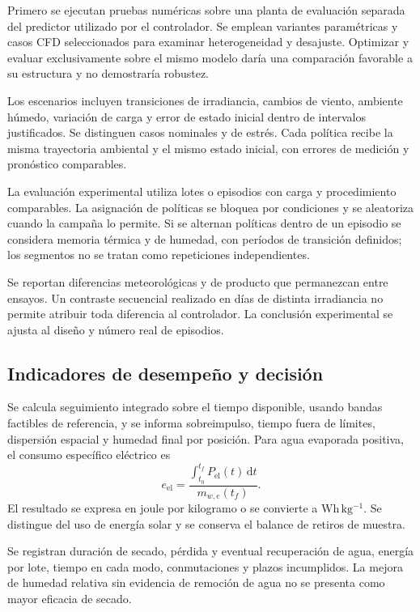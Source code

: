 Primero se ejecutan pruebas numéricas sobre una planta de evaluación separada del predictor utilizado por el controlador. Se emplean variantes paramétricas y casos CFD seleccionados para examinar heterogeneidad y desajuste. Optimizar y evaluar exclusivamente sobre el mismo modelo daría una comparación favorable a su estructura y no demostraría robustez.

Los escenarios incluyen transiciones de irradiancia, cambios de viento, ambiente húmedo, variación de carga y error de estado inicial dentro de intervalos justificados. Se distinguen casos nominales y de estrés. Cada política recibe la misma trayectoria ambiental y el mismo estado inicial, con errores de medición y pronóstico comparables.

La evaluación experimental utiliza lotes o episodios con carga y procedimiento comparables. La asignación de políticas se bloquea por condiciones y se aleatoriza cuando la campaña lo permite. Si se alternan políticas dentro de un episodio se considera memoria térmica y de humedad, con períodos de transición definidos; los segmentos no se tratan como repeticiones independientes.

Se reportan diferencias meteorológicas y de producto que permanezcan entre ensayos. Un contraste secuencial realizado en días de distinta irradiancia no permite atribuir toda diferencia al controlador. La conclusión experimental se ajusta al diseño y número real de episodios.

\subsection{Indicadores de desempeño y decisión}

Se calcula seguimiento integrado sobre el tiempo disponible, usando bandas factibles de referencia, y se informa sobreimpulso, tiempo fuera de límites, dispersión espacial y humedad final por posición. Para agua evaporada positiva, el consumo específico eléctrico es
\begin{equation}
e_{\mathrm{el}}=
\frac{\int_{t_0}^{t_f}P_{\mathrm{el}}(t)\,\mathrm dt}
{m_{w,e}(t_f)}.
\label{met:energia_especifica}
\end{equation}
El resultado se expresa en joule por kilogramo o se convierte a $\mathrm{Wh\,kg^{-1}}$. Se distingue del uso de energía solar y se conserva el balance de retiros de muestra.

Se registran duración de secado, pérdida y eventual recuperación de agua, energía por lote, tiempo en cada modo, conmutaciones y plazos incumplidos. La mejora de humedad relativa sin evidencia de remoción de agua no se presenta como mayor eficacia de secado.

